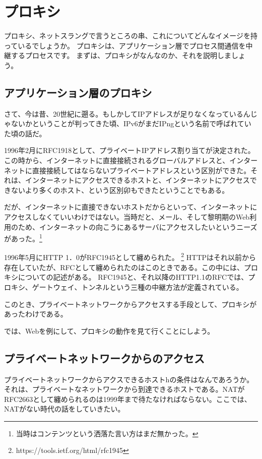 \chapter{プロキシ}
プロキシ、ネットスラングで言うところの串、これについてどんなイメージを持っているでしょうか。
プロキシは、アプリケーション層でプロセス間通信を中継するプロセスです。
まずは、プロキシがなんなのか、それを説明しましょう。

\section{アプリケーション層のプロキシ}
さて、今は昔、20世紀に遡る。もしかしてIPアドレスが足りなくなっているんじゃないかということが判ってきた頃、IPv6がまだIPngという名前で呼ばれていた頃の話だ。

1996年2月にRFC1918として、プライベートIPアドレス割り当てが決定された。この時から、インターネットに直接接続されるグローバルアドレスと、インターネットに直接接続してはならないプライベートアドレスという区別ができた。それは、インターネットにアクセスできるホストと、インターネットにアクセスできないより多くのホスト、という区別卯もできたということでもある。

だが、インターネットに直接できないホストだからといって、インターネットにアクセスしなくていいわけではない。当時だと、メール、そして黎明期のWeb利用のため、インターネットの向こうにあるサーバにアクセスしたいというニーズがあった。\footnote{当時はコンテンツという洒落た言い方はまだ無かった。}

1996年5月にHTTP 1．0がRFC1945として纏められた。
\footnote{https://tools.ietf.org/html/rfc1945}
HTTPはそれ以前から存在していたが、RFCとして纏められたのはこのときである。この中には、プロキシについての記述がある。
RFC1945と、それ以降のHTTP1.1のRFCでは、プロキシ、ゲートウェイ、トンネルという三種の中継方法が定義されている。

このとき、プライベートネットワークからアクセスする手段として、プロキシがあったわけである。

では、Webを例にして、プロキシの動作を見て行くことにしよう。


\section{プライベートネットワークからのアクセス}
プライベートネットワークからアクスできるホストhの条件はなんであろうか。それは、プライベートなネットワークから到達できるホストである。NATがRFC2663として纏められるのは1999年まで待たなければならない。ここでは、NATがない時代の話をしていきたい。

